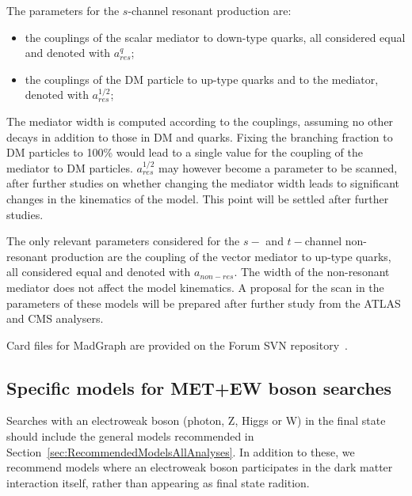 \documentclass[a4,debug,notitlepage,nobib]{tufte-handout}
\newif\ifATLAS
\newif\ifCMS
\begin{document}
The parameters for the $s$-channel resonant production are:
\begin{itemize}
 \item the couplings of the scalar mediator to down-type quarks, all considered equal and denoted with $a_{res}^q$;
 \item the couplings of the DM particle to up-type quarks and to the mediator, denoted with $a_{res}^{1/2}$;
\end{itemize}
The mediator width is computed according to the couplings, assuming no other decays in addition
to those in DM and quarks. Fixing the branching fraction to DM particles to 100\% would lead 
to a single value for the coupling of the mediator to DM particles. $a_{res}^{1/2}$ 
may however become a parameter to be scanned, after further studies on whether changing 
the mediator width leads to significant changes in the kinematics of the model. 
This point will be settled after further studies. 

The only relevant parameters considered for the $s-$ and $t-$channel non-resonant production 
are the coupling of the vector mediator to up-type quarks, all considered equal and denoted with $a_{non-res}$. 
The width of the non-resonant mediator does not affect the model kinematics. 
A proposal for the scan in the parameters of these models will be prepared after further study 
from the ATLAS and CMS analysers. 

Card files for MadGraph are provided on the Forum SVN repository~\cite{ForumSVN_EWMonoTop}.

% 

\ifATLAS
\textbf{[Open point: Add here implementation details for ATLAS.]}
\fi

\ifCMS
\textbf{[Open point: Add here implementation details for CMS..]}
\fi


\subsection{Specific models for MET+EW boson searches}

Searches with an electroweak boson (photon, Z, Higgs or W) in the
final state should include the general models recommended in
Section~\ref{sec:RecommendedModelsAllAnalyses}. In addition to these,
we recommend models where an electroweak boson participates in
the dark matter interaction itself, rather than appearing as final
state radition.
\end{document}
